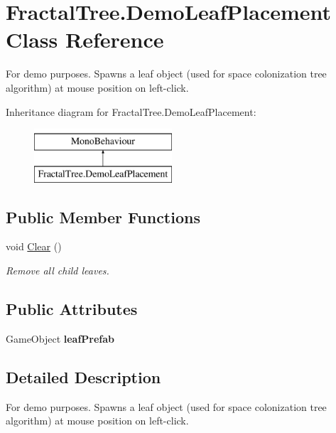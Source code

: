 \hypertarget{class_fractal_tree_1_1_demo_leaf_placement}{}\section{Fractal\+Tree.\+Demo\+Leaf\+Placement Class Reference}
\label{class_fractal_tree_1_1_demo_leaf_placement}


For demo purposes. Spawns a leaf object (used for space colonization tree algorithm) at mouse position on left-\/click.  


Inheritance diagram for Fractal\+Tree.\+Demo\+Leaf\+Placement\+:\begin{figure}[H]
\begin{center}
\leavevmode
\includegraphics[height=2.000000cm]{class_fractal_tree_1_1_demo_leaf_placement}
\end{center}
\end{figure}
\subsection*{Public Member Functions}
\begin{DoxyCompactItemize}
\item 
void \hyperlink{class_fractal_tree_1_1_demo_leaf_placement_a745d74525906a3177b7ac67ac94280cf}{Clear} ()
\begin{DoxyCompactList}\small\item\em Remove all child leaves. \end{DoxyCompactList}\end{DoxyCompactItemize}
\subsection*{Public Attributes}
\begin{DoxyCompactItemize}
\item 
\mbox{\label{class_fractal_tree_1_1_demo_leaf_placement_ad416455c3c21399f1b5cf36dd70ed60b}} 
Game\+Object {\bfseries leaf\+Prefab}
\end{DoxyCompactItemize}


\subsection{Detailed Description}
For demo purposes. Spawns a leaf object (used for space colonization tree algorithm) at mouse position on left-\/click. 




